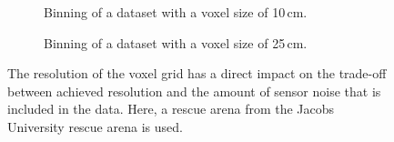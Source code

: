 \begin{figure}
\begin{subfigure}[b]{0.3\textwidth}
    \caption{Binning of a dataset with a voxel size of 10\,cm.}
    \label{contributions:usar:binning:10}
\end{subfigure}
\hspace*{3mm}
\begin{subfigure}[b]{0.3\textwidth}
    \caption{Binning of a dataset with a voxel size of 25\,cm.}
    \label{contributions:usar:binning:25}
\end{subfigure}
\caption{The resolution of the voxel grid has a direct impact on the trade-off between achieved resolution and the amount of sensor noise that is included in the data.  Here, a rescue arena from the Jacobs University rescue arena is used.}
\label{contributions:usar:binning}
\end{figure}

